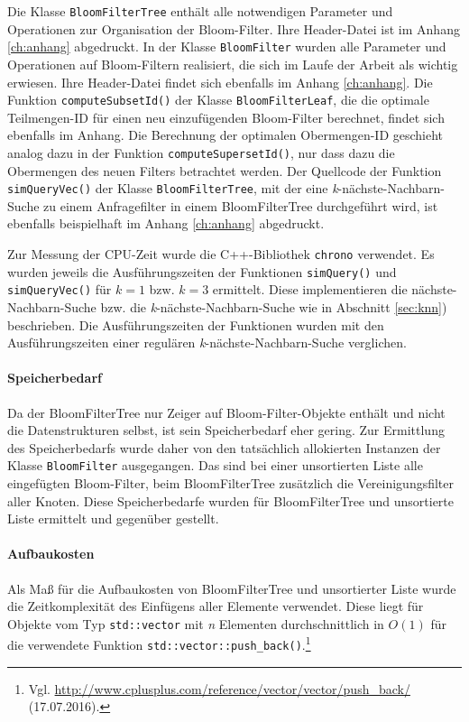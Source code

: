 Die Klasse \texttt{BloomFilterTree} enthält alle notwendigen Parameter und Operationen zur Organisation der Bloom-Filter. Ihre Header-Datei ist im Anhang \ref{ch:anhang} abgedruckt. In der Klasse \texttt{BloomFilter} wurden alle Parameter und Operationen auf Bloom-Filtern realisiert, die sich im Laufe der Arbeit als wichtig erwiesen. Ihre Header-Datei findet sich ebenfalls im Anhang \ref{ch:anhang}. Die Funktion \texttt{computeSubsetId()} der Klasse \texttt{BloomFilterLeaf}, die die optimale Teilmengen-ID für einen neu einzufügenden Bloom-Filter berechnet, findet sich ebenfalls im Anhang. Die Berechnung der optimalen Obermengen-ID geschieht analog dazu in der Funktion \texttt{computeSupersetId()}, nur dass dazu die Obermengen des neuen Filters betrachtet werden. Der Quellcode der Funktion \mbox{\texttt{simQueryVec()}} der Klasse \texttt{BloomFilterTree}, mit der eine \textit{k}-nächste-Nachbarn-Suche zu einem Anfragefilter in einem BloomFilterTree durchgeführt wird, ist ebenfalls beispielhaft im Anhang \ref{ch:anhang} abgedruckt.

Zur Messung der CPU-Zeit wurde die C++-Bibliothek \texttt{chrono} verwendet. Es wurden jeweils die Ausführungszeiten der Funktionen \texttt{simQuery()} und \texttt{simQueryVec()} für $k=1$ bzw. $k=3$ ermittelt. Diese implementieren die nächste-Nachbarn-Suche bzw. die \textit{k}-nächste-Nachbarn-Suche wie in Abschnitt \ref{sec:knn}) beschrieben. Die Ausführungszeiten der Funktionen wurden mit den Ausführungszeiten einer regulären \textit{k}-nächste-Nachbarn-Suche verglichen.
\paragraph*{Speicherbedarf} 
Da der BloomFilterTree nur Zeiger auf Bloom-Filter-Objekte enthält und nicht die Datenstrukturen selbst, ist sein Speicherbedarf eher gering. Zur Ermittlung des Speicherbedarfs wurde daher von den tatsächlich allokierten Instanzen der Klasse \texttt{BloomFilter} ausgegangen. Das sind bei einer unsortierten Liste alle eingefügten Bloom-Filter, beim BloomFilterTree zusätzlich die Vereinigungsfilter aller Knoten. Diese Speicherbedarfe wurden für BloomFilterTree und unsortierte Liste ermittelt und gegenüber gestellt. 
\paragraph*{Aufbaukosten}
Als Maß für die Aufbaukosten von BloomFilterTree und unsortierter Liste wurde die Zeitkomplexität des Einfügens aller Elemente verwendet. Diese liegt für Objekte vom Typ \texttt{std::vector} mit \textit{n} Elementen durchschnittlich in $O(1)$ für die verwendete Funktion \texttt{std::vector::push\_back()}.\footnote{Vgl. \url{http://www.cplusplus.com/reference/vector/vector/push_back/} (17.07.2016).}

